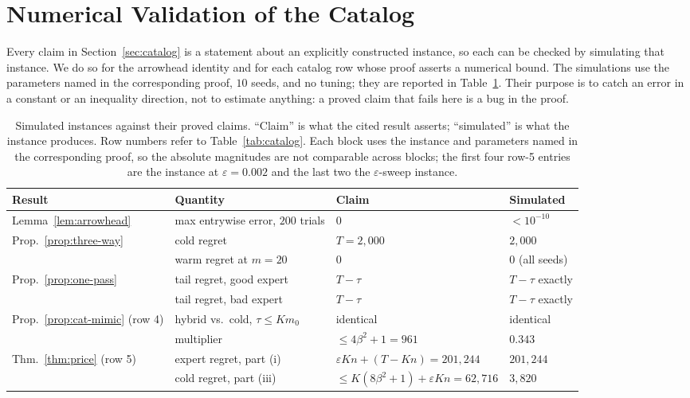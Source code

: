 \documentclass{article}
\theoremstyle{definition}
\theoremstyle{remark}
\newcommand{\eps}{\varepsilon}
\theoremstyle{remark}
\begin{document}
\section{Numerical Validation of the Catalog}
\label{app:synthetic}

Every claim in Section~\ref{sec:catalog} is a statement about an explicitly
constructed instance, so each can be checked by simulating that instance. We
do so for the arrowhead identity and for each catalog row whose proof asserts
a numerical bound. The simulations use the parameters named in the
corresponding proof, $10$ seeds, and no tuning; they are reported in
Table~\ref{tab:synthetic}. Their purpose is to catch an error in a constant or
an inequality direction, not to estimate anything: a proved claim that fails
here is a bug in the proof.

\begin{table}[h]
\centering
\caption{Simulated instances against their proved claims. ``Claim'' is what
the cited result asserts; ``simulated'' is what the instance produces. Row
numbers refer to Table~\ref{tab:catalog}. Each block uses the instance and
parameters named in the corresponding proof, so the absolute magnitudes are
not comparable across blocks; the first four row-5 entries are the instance at
$\eps=0.002$ and the last two the $\eps$-sweep instance.}
\label{tab:synthetic}
\small
\setlength{\tabcolsep}{4pt}
\begin{tabular}{@{}llll@{}}
\toprule
Result & Quantity & Claim & Simulated \\
\midrule
Lemma~\ref{lem:arrowhead} & max entrywise error, $200$ trials & $0$ & $<10^{-10}$ \\
\midrule
Prop.~\ref{prop:three-way} & cold regret & $T=2{,}000$ & $2{,}000$ \\
 & warm regret at $m=20$ & $0$ & $0$ (all seeds) \\
Prop.~\ref{prop:one-pass} & tail regret, good expert & $T-\tau$ & $T-\tau$ exactly \\
 & tail regret, bad expert & $T-\tau$ & $T-\tau$ exactly \\
\midrule
Prop.~\ref{prop:cat-mimic} (row 4) & hybrid vs.\ cold, $\tau\le Km_0$ & identical & identical \\
 & multiplier & $\le4\beta^2+1=961$ & $0.343$ \\
\midrule
Thm.~\ref{thm:price} (row 5) & expert regret, part (i) & $\eps Kn+(T{-}Kn)=201{,}244$ & $201{,}244$ \\
 & cold regret, part (iii) & $\le K(8\beta^2{+}1)+\eps Kn=62{,}716$ & $3{,}820$ \\

\end{tabular}
\end{table}
\end{document}
